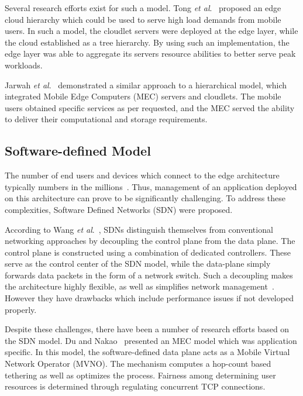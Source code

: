 Several research efforts exist for such a model. Tong \textit{et al}.~\cite{tong2016hierarchical} proposed an edge cloud hierarchy which could be used to serve high load demands from mobile users. In such a model, the cloudlet servers were deployed at the edge layer, while the cloud established as a tree hierarchy. By using such an implementation, the edge layer was able to aggregate its servers resource abilities to better serve peak workloads.\par

Jarwah \textit{et al}.~\cite{jararweh2016future} demonstrated a similar approach to a hierarchical model, which integrated Mobile Edge Computers (MEC) servers and cloudlets. The mobile users obtained specific services as per requested, and the MEC served the ability to deliver their computational and storage requirements.\par

\subsection{Software-defined Model}
\label{subsec:ch3-software-defined-model}

The number of end users and devices which connect to the edge architecture typically numbers in the millions~\cite{yu2017survey}. Thus, management of an application deployed on this architecture can prove to be significantly challenging. To address these complexities, Software Defined Networks (SDN) were proposed.\par

According to Wang \textit{et al}.~\cite{wang2017controller}, SDNs distinguish themselves from conventional networking approaches by decoupling the control plane from the data plane. The control plane is constructed using a combination of dedicated controllers. These serve as the control center of the SDN model, while the data-plane simply forwards data packets in the form of a network switch. Such a decoupling makes the architecture highly flexible, as well as simplifies network management~\cite{liu2015device}. However they have drawbacks which include performance issues if not developed properly.\par

Despite these challenges, there have been a number of research efforts based on the SDN model. Du and Nakao~\cite{du2016application} presented an MEC model which was application specific. In this model, the software-defined data plane acts as a Mobile Virtual Network Operator (MVNO). The mechanism computes a hop-count based tethering as well as optimizes the process.  Fairness among determining user resources is determined through regulating concurrent TCP connections.\par

